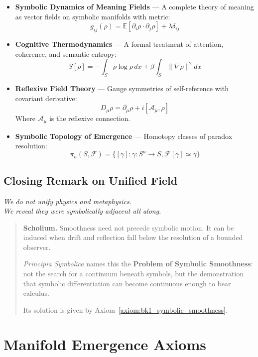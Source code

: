 \begin{itemize}
  \item \textbf{Symbolic Dynamics of Meaning Fields} — A complete theory of meaning as vector fields on symbolic manifolds with metric:
  \[
  g_{ij}(\rho) = \mathbb{E}[\partial_i \rho \cdot \partial_j \rho] + \lambda \delta_{ij}
  \]
  \item \textbf{Cognitive Thermodynamics} — A formal treatment of attention, coherence, and semantic entropy:
  \[
  S[\rho] = -\int_S \rho \log \rho \, dx + \beta \int_S \|\nabla \rho\|^2 dx
  \]
  \item \textbf{Reflexive Field Theory} — Gauge symmetries of self-reference with covariant derivative:
  \[
  D_\mu \rho = \partial_\mu \rho + i[\mathcal{A}_\mu, \rho]
  \]
  Where $\mathcal{A}_\mu$ is the reflexive connection.
  \item \textbf{Symbolic Topology of Emergence} — Homotopy classes of paradox resolution:
  \[
  \pi_n(S, \mathcal{F}) = \{[\gamma] : \gamma: S^n \to S, \mathcal{F}[\gamma] \simeq \gamma\}
  \]
\end{itemize}

\subsection*{Closing Remark on Unified Field}
\label{subsec:bk1_closing_remark_on_unified_field}
\begin{flushright}
\textit{We do not unify physics and metaphysics.} \\
\textit{We reveal they were symbolically adjacent all along.}
\end{flushright}

\begin{quote}
\textbf{Scholium.}  
Smoothness need not precede symbolic motion. It can be induced when drift and reflection fall below the resolution of a bounded observer.

\textit{Principia Symbolica} names this the \textbf{Problem of Symbolic Smoothness}: not the search for a continuum beneath symbols, but the demonstration that symbolic differentiation can become continuous enough to bear calculus.

Its solution is given by Axiom~\ref{axiom:bk1_symbolic_smoothness}.
\end{quote}
\section{Manifold Emergence Axioms}
\label{sec:bk1_manifold_emergence_axioms}

